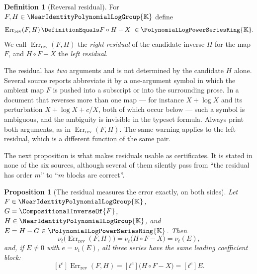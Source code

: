 \documentclass[11pt,oneside]{article}
\theoremstyle{plain}
\newtheorem{proposition}[theorem]{Proposition}
\theoremstyle{definition}
\newtheorem{definition}[theorem]{Definition}
\theoremstyle{remark}
\newcommand{\K}{\mathbb{K}}
\newcommand{\PLpow}{\PolynomialLogPowerSeriesRing{\K}}   %
\newcommand{\Gnear}{\NearIdentityPolynomialLogGroup{\K}} %
\newcommand{\ordt}{\nu_{t}}                              %
\newcommand{\compose}{\mathbin{\circ}}
\newcommand{\rev}[1]{\CompositionalInverseOf{#1}}
\newcommand{\RevErr}[2]{\operatorname{Err}_{\mathrm{rev}}\!\left(#1,#2\right)}
\begin{document}
\begin{definition}[Reversal residual]
\label{plt:def:rev-residual}
For \(F,H\in\Gnear\) define
\begin{equation}\label{plt:eq:rev-residual-def}
 \RevErr{F}{H}\DefinitionEquals F\compose H-X\ \in\PLpow .
\end{equation}
We call \(\RevErr{F}{H}\) the \emph{right residual} of the candidate inverse
\(H\) for the map \(F\), and \(H\compose F-X\) the \emph{left residual}.
\end{definition}

\begin{warningbox}
The residual has \emph{two} arguments and is not determined by the candidate
\(H\) alone.  Several source reports abbreviate it by a one-argument symbol in
which the ambient map \(F\) is pushed into a subscript or into the surrounding
prose.  In a document that reverses more than one map --- for instance
\(X+\log X\) and its perturbation \(X+\log X+c/X\), both of which occur below
--- such a symbol is ambiguous, and the ambiguity is invisible in the typeset
formula.  Always print both arguments, as in \(\RevErr{F}{H}\).  The same
warning applies to the left residual, which is a different function of the
same pair.
\end{warningbox}

The next proposition is what makes residuals usable as certificates.  It is
stated in none of the six sources, although several of them silently pass from
``the residual has order \(m\)'' to ``\(m\) blocks are correct''.

\begin{proposition}[The residual measures the error exactly, on both sides]
\label{plt:prop:rev-residual-order}
Let \(F\in\Gnear\), \(G=\rev{F}\), \(H\in\Gnear\), and \(E=H-G\in\PLpow\).
Then
\begin{equation}\label{plt:eq:rev-residual-order}
 \ordt\bigl(\RevErr{F}{H}\bigr)
 =\ordt\bigl(H\compose F-X\bigr)
 =\ordt(E),
\end{equation}
and, if \(E\ne0\) with \(e=\ordt(E)\), all three series have the \emph{same}
leading coefficient block:
\[
 [t^{e}]\RevErr{F}{H}=[t^{e}]\bigl(H\compose F-X\bigr)=[t^{e}]E .
\]
\end{proposition}
\end{document}
